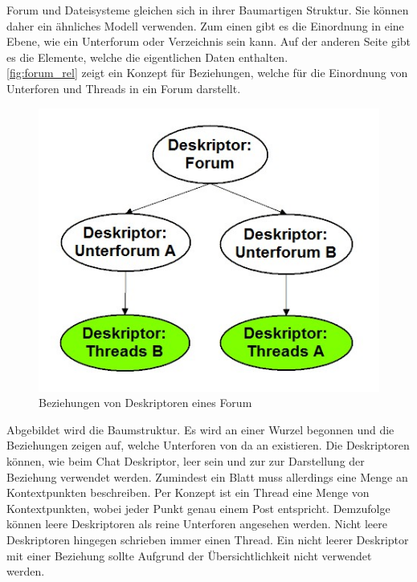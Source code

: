 \documentclass[a4paper]{article}
\begin{document}
	Forum und Dateisysteme gleichen sich in ihrer Baumartigen Struktur. Sie können
	daher ein ähnliches Modell verwenden. Zum einen gibt es die Einordnung
	in eine Ebene, wie ein Unterforum oder Verzeichnis sein kann. Auf der anderen
	Seite gibt es die Elemente, welche die eigentlichen Daten enthalten. \\
	
	\autoref{fig:forum_rel} zeigt ein Konzept für Beziehungen, welche für die
	Einordnung von Unterforen und Threads in ein Forum darstellt.
	
	\begin{figure}[H]
		\includegraphics[width=\linewidth]{../Bilder/forum_rel.jpg}
		\caption{Beziehungen von Deskriptoren eines Forum}
		\label{fig:forum_rel}
	\end{figure}
	
	Abgebildet wird die Baumstruktur. Es wird an einer Wurzel begonnen und
	die Beziehungen zeigen auf, welche Unterforen von da an existieren. Die
	Deskriptoren können, wie beim Chat Deskriptor, leer sein und zur zur
	Darstellung der Beziehung verwendet werden. Zumindest ein Blatt muss
	allerdings eine Menge an Kontextpunkten beschreiben. Per Konzept ist ein Thread 
	eine Menge von Kontextpunkten, wobei jeder Punkt genau einem Post entspricht.
	Demzufolge können leere Deskriptoren als reine Unterforen angesehen werden.
	Nicht leere Deskriptoren hingegen schrieben immer einen Thread. Ein nicht
	leerer Deskriptor mit einer Beziehung sollte Aufgrund der Übersichtlichkeit
	nicht verwendet werden. \\
	
\end{document}
